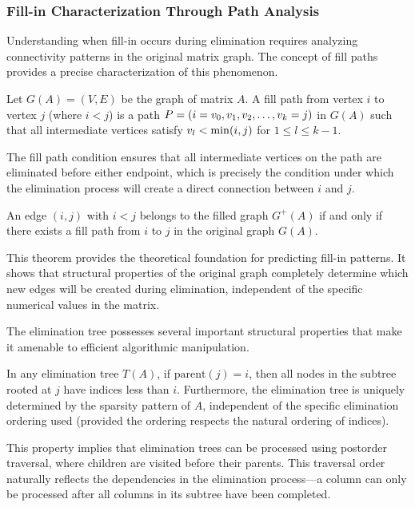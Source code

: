 \subsubsection{Fill-in Characterization Through Path Analysis}
Understanding when fill-in occurs during elimination requires analyzing connectivity patterns in the original matrix graph. The concept of fill paths provides a precise characterization of this phenomenon.

\begin{definition}
Let $G(A) = (V, E)$ be the graph of matrix $A$. A fill path from vertex $i$ to vertex $j$ (where $i < j$) is a path $P = (i = v\sb{0}, v\sb{1}, v\sb{2}, \ldots, v\sb{k} = j)$ in $G(A)$ such that all intermediate vertices satisfy $v\sb{l} < \min(i,j)$ for $1 \leq l \leq k-1$.
\end{definition}

The fill path condition ensures that all intermediate vertices on the path are eliminated before either endpoint, which is precisely the condition under which the elimination process will create a direct connection between $i$ and $j$.

\begin{theorem}
An edge $(i,j)$ with $i < j$ belongs to the filled graph $G^+(A)$ if and only if there exists a fill path from $i$ to $j$ in the original graph $G(A)$.
\end{theorem}

This theorem provides the theoretical foundation for predicting fill-in patterns. It shows that structural properties of the original graph completely determine which new edges will be created during elimination, independent of the specific numerical values in the matrix.

The elimination tree possesses several important structural properties that make it amenable to efficient algorithmic manipulation.

\begin{theorem}
In any elimination tree $T(A)$, if $\text{parent}(j) = i$, then all nodes in the subtree rooted at $j$ have indices less than $i$. Furthermore, the elimination tree is uniquely determined by the sparsity pattern of $A$, independent of the specific elimination ordering used (provided the ordering respects the natural ordering of indices).
\end{theorem}

This property implies that elimination trees can be processed using postorder traversal, where children are visited before their parents. This traversal order naturally reflects the dependencies in the elimination process—a column can only be processed after all columns in its subtree have been completed.

